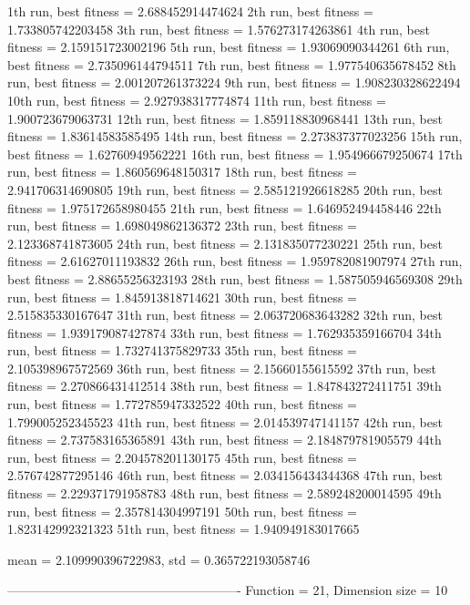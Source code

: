 1th run, best fitness = 2.688452914474624
2th run, best fitness = 1.733805742203458
3th run, best fitness = 1.576273174263861
4th run, best fitness = 2.159151723002196
5th run, best fitness = 1.93069090344261
6th run, best fitness = 2.735096144794511
7th run, best fitness = 1.977540635678452
8th run, best fitness = 2.001207261373224
9th run, best fitness = 1.908230328622494
10th run, best fitness = 2.927938317774874
11th run, best fitness = 1.900723679063731
12th run, best fitness = 1.859118830968441
13th run, best fitness = 1.83614583585495
14th run, best fitness = 2.273837377023256
15th run, best fitness = 1.62760949562221
16th run, best fitness = 1.954966679250674
17th run, best fitness = 1.860569648150317
18th run, best fitness = 2.941706314690805
19th run, best fitness = 2.585121926618285
20th run, best fitness = 1.975172658980455
21th run, best fitness = 1.646952494458446
22th run, best fitness = 1.698049862136372
23th run, best fitness = 2.123368741873605
24th run, best fitness = 2.131835077230221
25th run, best fitness = 2.61627011193832
26th run, best fitness = 1.959782081907974
27th run, best fitness = 2.88655256323193
28th run, best fitness = 1.587505946569308
29th run, best fitness = 1.845913818714621
30th run, best fitness = 2.515835330167647
31th run, best fitness = 2.063720683643282
32th run, best fitness = 1.939179087427874
33th run, best fitness = 1.762935359166704
34th run, best fitness = 1.732741375829733
35th run, best fitness = 2.105398967572569
36th run, best fitness = 2.15660155615592
37th run, best fitness = 2.270866431412514
38th run, best fitness = 1.847843272411751
39th run, best fitness = 1.772785947332522
40th run, best fitness = 1.799005252345523
41th run, best fitness = 2.014539747141157
42th run, best fitness = 2.737583165365891
43th run, best fitness = 2.184879781905579
44th run, best fitness = 2.204578201130175
45th run, best fitness = 2.576742877295146
46th run, best fitness = 2.034156434344368
47th run, best fitness = 2.229371791958783
48th run, best fitness = 2.589248200014595
49th run, best fitness = 2.357814304997191
50th run, best fitness = 1.823142992321323
51th run, best fitness = 1.940949183017665

mean = 2.109990396722983, std = 0.365722193058746

-------------------------------------------------------
Function = 21, Dimension size = 10


